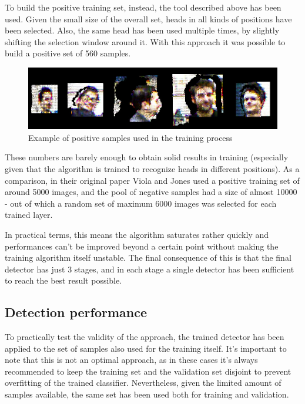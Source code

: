 \documentclass[a4paper,11pt,titlepage]{article}
\begin{document}
To build the positive training set, instead, the tool described above has been
used. Given the small size of the overall set, heads in all kinds of positions
have been selected. Also, the same head has been used multiple times, by
slightly shifting the selection window around it. With this approach it was
possible to build a positive set of 560 samples.

\begin{figure}[h]
  \centering
  \includegraphics[scale=0.8]{positive_samples.jpg}
  \caption{Example of positive samples used in the training process}
  \label{fig:positive_samples}
\end{figure}

These numbers are barely enough to obtain solid results in training (especially
given that the algorithm is trained to recognize heads in different positions).
As a comparison, in their original paper Viola and Jones used a positive
training set of around 5000 images, and the pool of negative samples had a size
of almost 10000 - out of which a random set of maximum 6000 images was selected
for each trained layer.

In practical terms, this means the algorithm saturates rather quickly and
performances can't be improved beyond a certain point without making the
training algorithm itself unstable. The final consequence of this is that the
final detector has just 3 stages, and in each stage a single detector has been
sufficient to reach the best result possible.

\subsection{Detection performance}
To practically test the validity of the approach, the trained detector has been
applied to the set of samples also used for the training itself. It's important
to note that this is not an optimal approach, as in these cases it's always
recommended to keep the training set and the validation set disjoint to prevent
overfitting of the trained classifier. Nevertheless, given the limited amount of
samples available, the same set has been used both for training and validation.
\end{document}
